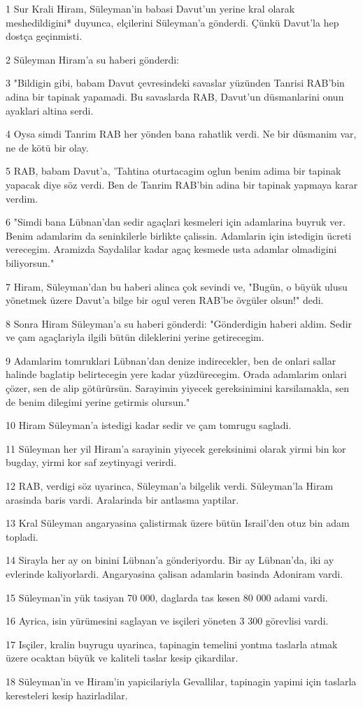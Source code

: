 \par 1 Sur Krali Hiram, Süleyman'in babasi Davut'un yerine kral olarak meshedildigini* duyunca, elçilerini Süleyman'a gönderdi. Çünkü Davut'la hep dostça geçinmisti.
\par 2 Süleyman Hiram'a su haberi gönderdi:
\par 3 "Bildigin gibi, babam Davut çevresindeki savaslar yüzünden Tanrisi RAB'bin adina bir tapinak yapamadi. Bu savaslarda RAB, Davut'un düsmanlarini onun ayaklari altina serdi.
\par 4 Oysa simdi Tanrim RAB her yönden bana rahatlik verdi. Ne bir düsmanim var, ne de kötü bir olay.
\par 5 RAB, babam Davut'a, 'Tahtina oturtacagim oglun benim adima bir tapinak yapacak diye söz verdi. Ben de Tanrim RAB'bin adina bir tapinak yapmaya karar verdim.
\par 6 "Simdi bana Lübnan'dan sedir agaçlari kesmeleri için adamlarina buyruk ver. Benim adamlarim da seninkilerle birlikte çalissin. Adamlarin için istedigin ücreti verecegim. Aramizda Saydalilar kadar agaç kesmede usta adamlar olmadigini biliyorsun."
\par 7 Hiram, Süleyman'dan bu haberi alinca çok sevindi ve, "Bugün, o büyük ulusu yönetmek üzere Davut'a bilge bir ogul veren RAB'be övgüler olsun!" dedi.
\par 8 Sonra Hiram Süleyman'a su haberi gönderdi: "Gönderdigin haberi aldim. Sedir ve çam agaçlariyla ilgili bütün dileklerini yerine getirecegim.
\par 9 Adamlarim tomruklari Lübnan'dan denize indirecekler, ben de onlari sallar halinde baglatip belirtecegin yere kadar yüzdürecegim. Orada adamlarim onlari çözer, sen de alip götürürsün. Sarayimin yiyecek gereksinimini karsilamakla, sen de benim dilegimi yerine getirmis olursun."
\par 10 Hiram Süleyman'a istedigi kadar sedir ve çam tomrugu sagladi.
\par 11 Süleyman her yil Hiram'a sarayinin yiyecek gereksinimi olarak yirmi bin kor bugday, yirmi kor saf zeytinyagi verirdi.
\par 12 RAB, verdigi söz uyarinca, Süleyman'a bilgelik verdi. Süleyman'la Hiram arasinda baris vardi. Aralarinda bir antlasma yaptilar.
\par 13 Kral Süleyman angaryasina çalistirmak üzere bütün Israil'den otuz bin adam topladi.
\par 14 Sirayla her ay on binini Lübnan'a gönderiyordu. Bir ay Lübnan'da, iki ay evlerinde kaliyorlardi. Angaryasina çalisan adamlarin basinda Adoniram vardi.
\par 15 Süleyman'in yük tasiyan 70 000, daglarda tas kesen 80 000 adami vardi.
\par 16 Ayrica, isin yürümesini saglayan ve isçileri yöneten 3 300 görevlisi vardi.
\par 17 Isçiler, kralin buyrugu uyarinca, tapinagin temelini yontma taslarla atmak üzere ocaktan büyük ve kaliteli taslar kesip çikardilar.
\par 18 Süleyman'in ve Hiram'in yapicilariyla Gevallilar, tapinagin yapimi için taslarla keresteleri kesip hazirladilar.

